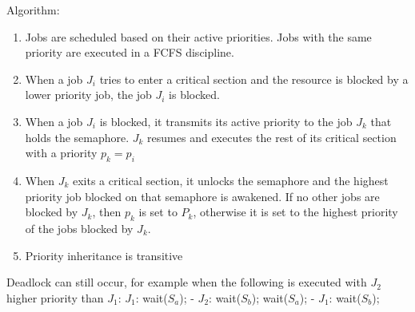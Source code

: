 Algorithm:

\begin{enumerate}[noitemsep]
\item Jobs are scheduled based on their active priorities. Jobs with the 
same priority are executed in a FCFS discipline.
\item When a job $J_i$ tries to enter a critical section and the resource is
blocked by a lower priority job, the job $J_i$ is blocked.
\item When a job $J_i$ is blocked, it transmits its active priority to the job $J_k$
that holds the semaphore. $J_k$ resumes and executes the rest of its
critical section with a priority $p_k=p_i$
\item When $J_k$ exits a critical section, it unlocks the semaphore and the
highest priority job blocked on that semaphore is awakened. If no
other jobs are blocked by $J_k$, then $p_k$ is set to $P_k$, otherwise it is set to
the highest priority of the jobs blocked by $J_k$.
\item Priority inheritance is transitive
\end{enumerate}

Deadlock can still occur, for example when the following is executed with $J_2$ higher priority than $J_1$:
$J_1$: wait($S_a$); - $J_2$: wait($S_b$); wait($S_a$); - $J_1$: wait($S_b$);

\cleardoublepage